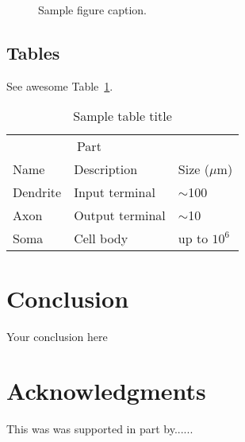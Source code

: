 \documentclass{article}
\begin{document}
\begin{figure}
  \centering
  \fbox{\rule[-.5cm]{4cm}{4cm} \rule[-.5cm]{4cm}{0cm}}
  \caption{Sample figure caption.}
  \label{fig:fig1}
\end{figure}

\subsection{Tables}
See awesome Table~\ref{tab:table}.

\begin{table}
 \caption{Sample table title}
  \centering
  \begin{tabular}{lll}
    \toprule
    \multicolumn{2}{c}{Part}                   \\
    \cmidrule(r){1-2}
    Name     & Description     & Size ($\mu$m) \\
    \midrule
    Dendrite & Input terminal  & $\sim$100     \\
    Axon     & Output terminal & $\sim$10      \\
    Soma     & Cell body       & up to $10^6$  \\
    \bottomrule
  \end{tabular}
  \label{tab:table}
\end{table}

\section{Conclusion}
Your conclusion here

\section*{Acknowledgments}
This was was supported in part by......

  
  
\end{document}
